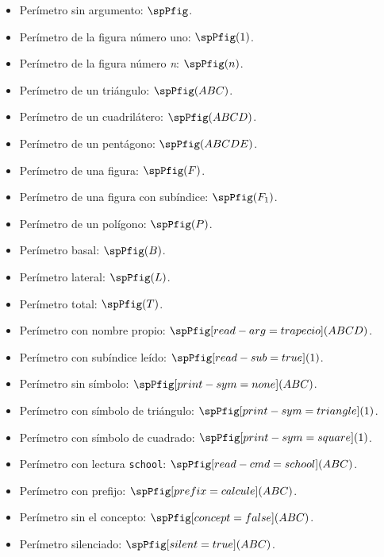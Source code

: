 \documentclass{article}
\begin{document}
\begin{itemize}
  \item Perímetro sin argumento: $\spPfig$.
  \item Perímetro de la figura número uno: $\spPfig(1)$.
  \item Perímetro de la figura número \emph{n}: $\spPfig(n)$.
  \item Perímetro de un triángulo: $\spPfig(ABC)$.
  \item Perímetro de un cuadrilátero: $\spPfig(ABCD)$.
  \item Perímetro de un pentágono: $\spPfig(ABCDE)$.
  \item Perímetro de una figura: $\spPfig(F)$.
  \item Perímetro de una figura con subíndice: $\spPfig(F_{1})$.
  \item Perímetro de un polígono: $\spPfig(P)$.
  \item Perímetro basal: $\spPfig(B)$.
  \item Perímetro lateral: $\spPfig(L)$.
  \item Perímetro total: $\spPfig(T)$.
  \item Perímetro con nombre propio: $\spPfig[read-arg={trapecio}](ABCD)$.
  \item Perímetro con subíndice leído: $\spPfig[read-sub=true](1)$.
  \item Perímetro sin símbolo: $\spPfig[print-sym=none](ABC)$.
  \item Perímetro con símbolo de triángulo: $\spPfig[print-sym=triangle](1)$.
  \item Perímetro con símbolo de cuadrado: $\spPfig[print-sym=square](1)$.
  \item Perímetro con lectura \texttt{school}: $\spPfig[read-cmd=school](ABC)$.
  \item Perímetro con prefijo: $\spPfig[prefix={calcule}](ABC)$.
  \item Perímetro sin el concepto: $\spPfig[concept=false](ABC)$.
  \item Perímetro silenciado: $\spPfig[silent=true](ABC)$.
\end{itemize}
\end{document}
